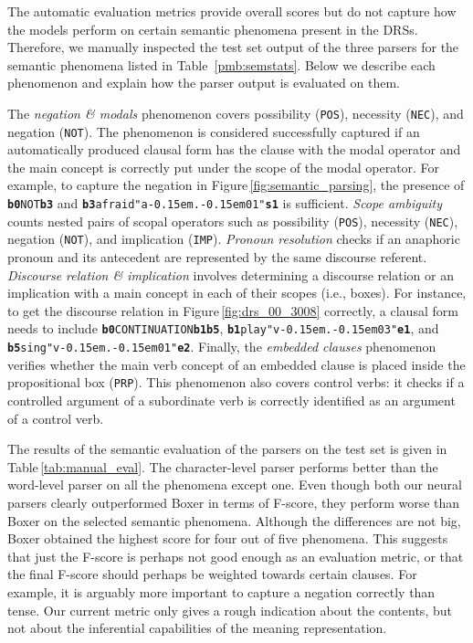 \documentclass[11pt,a4paper]{article}
\newcommand{\drgvar}[1]{\textbf{#1}}
\newcommand{\posn}[2]{#1\kern-0.15em.\kern-0.15em#2}
\begin{document}
The automatic evaluation metrics provide overall scores but do not capture how the models perform on certain semantic phenomena present in the DRSs. Therefore, we manually inspected the test set output of the three parsers for the semantic phenomena listed in Table~\ref{pmb:semstats}. 
Below we describe each phenomenon and explain how the parser output is evaluated on them.


The \textit{negation \& modals} phenomenon covers possibility (\texttt{POS}), necessity (\texttt{NEC}), and negation (\texttt{NOT}).
The phenomenon is considered successfully captured if an automatically produced clausal form has the clause with the modal operator and the main concept is correctly put under the scope of the modal operator. 
For example, to capture the negation in Figure\,\ref{fig:semantic_parsing}, the presence of {\small \texttt{\drgvar{b0}\;NOT\;\drgvar{b3}}} and {\small\texttt{\drgvar{b3}\;afraid\;"\posn{a}{01}"\;\drgvar{s1}}} is sufficient.   
\textit{Scope ambiguity} counts nested pairs of scopal operators such as possibility (\texttt{POS}), necessity (\texttt{NEC}), negation (\texttt{NOT}), and implication (\texttt{IMP}).
\textit{Pronoun resolution} checks if an anaphoric pronoun and its antecedent are represented by the same discourse referent.   
\textit{Discourse relation \& implication} involves determining a discourse relation or an implication with a main concept in each of their scopes (i.e., boxes).
For instance, to get the discourse relation in Figure\,\ref{fig:drs_00_3008} correctly, a clausal form needs to include 
{\small\texttt{\drgvar{b0}\;CONTINUATION\;\drgvar{b1}\;\drgvar{b5}}}, {\small\texttt{\drgvar{b1}\;play\;"\posn{v}{03}"\;\drgvar{e1}}}, 
and {\small\texttt{\drgvar{b5}\;sing\;"\posn{v}{01}"\;\drgvar{e2}}}.
Finally, the \textit{embedded clauses} phenomenon verifies whether the main verb concept of an embedded clause is placed inside the propositional box (\texttt{PRP}).
This phenomenon also covers control verbs: it checks if a controlled argument of a subordinate verb is correctly identified as an argument of a control verb.

The results of the semantic evaluation of the parsers on the test set is given in Table\,\ref{tab:manual_eval}. 
The character-level parser performs better than the word-level parser on all the phenomena except 
one.
Even though both our neural parsers clearly outperformed Boxer in terms of F-score, they perform worse than Boxer on the selected semantic phenomena. Although the differences are not big, Boxer obtained the highest score for four out of five phenomena.
This suggests that just the F-score is perhaps not good enough as an evaluation metric, or that the final F-score should perhaps be weighted towards certain clauses. For example, it is arguably more important to capture a negation correctly than tense. 
Our current metric only gives a rough indication about the contents, but not about the inferential capabilities of the meaning representation.
\end{document}
